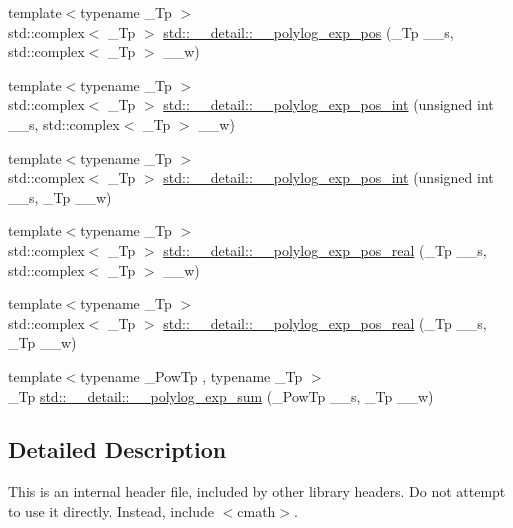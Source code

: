\begin{DoxyCompactItemize}
\item 
{\footnotesize template$<$typename \+\_\+\+Tp $>$ }\\std\+::complex$<$ \+\_\+\+Tp $>$ \hyperlink{namespacestd_1_1____detail_a56b0f5bc6f4955469fd5f83105cbd466}{std\+::\+\_\+\+\_\+detail\+::\+\_\+\+\_\+polylog\+\_\+exp\+\_\+pos} (\+\_\+\+Tp \+\_\+\+\_\+s, std\+::complex$<$ \+\_\+\+Tp $>$ \+\_\+\+\_\+w)
\item 
{\footnotesize template$<$typename \+\_\+\+Tp $>$ }\\std\+::complex$<$ \+\_\+\+Tp $>$ \hyperlink{namespacestd_1_1____detail_a84081b0dd494f4601f2d40768e71b7b4}{std\+::\+\_\+\+\_\+detail\+::\+\_\+\+\_\+polylog\+\_\+exp\+\_\+pos\+\_\+int} (unsigned int \+\_\+\+\_\+s, std\+::complex$<$ \+\_\+\+Tp $>$ \+\_\+\+\_\+w)
\item 
{\footnotesize template$<$typename \+\_\+\+Tp $>$ }\\std\+::complex$<$ \+\_\+\+Tp $>$ \hyperlink{namespacestd_1_1____detail_a6d05f9213f03b1781250cc048739e55b}{std\+::\+\_\+\+\_\+detail\+::\+\_\+\+\_\+polylog\+\_\+exp\+\_\+pos\+\_\+int} (unsigned int \+\_\+\+\_\+s, \+\_\+\+Tp \+\_\+\+\_\+w)
\item 
{\footnotesize template$<$typename \+\_\+\+Tp $>$ }\\std\+::complex$<$ \+\_\+\+Tp $>$ \hyperlink{namespacestd_1_1____detail_a36da38ab2aa8a67c089412937d5a695b}{std\+::\+\_\+\+\_\+detail\+::\+\_\+\+\_\+polylog\+\_\+exp\+\_\+pos\+\_\+real} (\+\_\+\+Tp \+\_\+\+\_\+s, std\+::complex$<$ \+\_\+\+Tp $>$ \+\_\+\+\_\+w)
\item 
{\footnotesize template$<$typename \+\_\+\+Tp $>$ }\\std\+::complex$<$ \+\_\+\+Tp $>$ \hyperlink{namespacestd_1_1____detail_a8a6390a3855283fc27a5d57dd736b62e}{std\+::\+\_\+\+\_\+detail\+::\+\_\+\+\_\+polylog\+\_\+exp\+\_\+pos\+\_\+real} (\+\_\+\+Tp \+\_\+\+\_\+s, \+\_\+\+Tp \+\_\+\+\_\+w)
\item 
{\footnotesize template$<$typename \+\_\+\+Pow\+Tp , typename \+\_\+\+Tp $>$ }\\\+\_\+\+Tp \hyperlink{namespacestd_1_1____detail_acbdb1ad0debb8c919b4dcb1589af734c}{std\+::\+\_\+\+\_\+detail\+::\+\_\+\+\_\+polylog\+\_\+exp\+\_\+sum} (\+\_\+\+Pow\+Tp \+\_\+\+\_\+s, \+\_\+\+Tp \+\_\+\+\_\+w)
\end{DoxyCompactItemize}


\subsection{Detailed Description}
This is an internal header file, included by other library headers. Do not attempt to use it directly. Instead, include $<$cmath$>$. 

